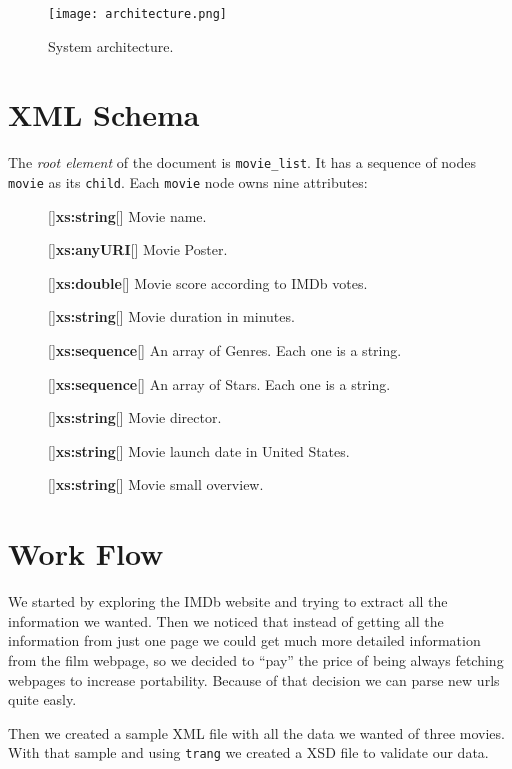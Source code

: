\documentclass[a4paper]{article}
\begin{document}
\begin{figure}[h!]
	\centering
	\texttt{[image: architecture.png]}
	\caption{System architecture.}
\end{figure}
\clearpage

\section{XML Schema}
\indent \indent The \emph{root element} of the document is \texttt{movie\_list}. It has a sequence of nodes \texttt{movie} as its \texttt{child}.
Each \texttt{movie} node owns nine attributes:
\begin{description}
	\item [] [{]\textbf{xs:string}[}]
		Movie name.
	\item [] [{]\textbf{xs:anyURI}[}]
		Movie Poster.
	\item [] [{]\textbf{xs:double}[}]
		Movie score according to IMDb votes.
	\item [] [{]\textbf{xs:string}[}]
		Movie duration in minutes.
	\item [] [{]\textbf{xs:sequence}[}]
		An array of Genres. Each one is a string.
	\item [] [{]\textbf{xs:sequence}[}]
		An array of Stars. Each one is a string.
	\item [] [{]\textbf{xs:string}[}]
		Movie director.
	\item [] [{]\textbf{xs:string}[}]
		Movie launch date in United States.
	\item [] [{]\textbf{xs:string}[}]
		Movie small overview.
\end{description}

\section{Work Flow}
\indent \indent We started by exploring the IMDb website and trying to extract all the information we wanted. Then we noticed that instead of getting all the information from just one page we could get much more detailed information from the film webpage, so we decided to ``pay'' the price of being always fetching webpages to increase portability. Because of that decision we can parse new urls quite easly.

Then we created a sample XML file with all the data we wanted of three movies. With that sample and using \texttt{trang} we created a XSD file to validate our data.
\end{document}
